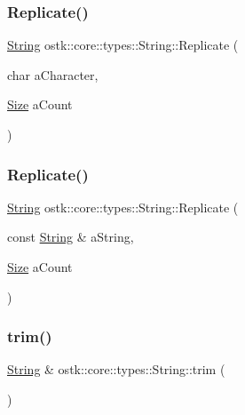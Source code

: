\subsubsection{\texorpdfstring{Replicate()}{Replicate()}\hspace{0.1cm}{\footnotesize\ttfamily [1/2]}}
{\footnotesize\ttfamily \hyperlink{classostk_1_1core_1_1types_1_1_string}{String} ostk\+::core\+::types\+::\+String\+::\+Replicate (\begin{DoxyParamCaption}\item[{char}]{a\+Character,  }\item[{\hyperlink{namespaceostk_1_1core_1_1types_acf68f214a245e35a7c1994c84dc56746}{Size}}]{a\+Count }\end{DoxyParamCaption})\hspace{0.3cm}{\ttfamily [static]}}

\mbox{\label{classostk_1_1core_1_1types_1_1_string_afb3e7dae9340e7494ec875b6f65312d2}} 
\subsubsection{\texorpdfstring{Replicate()}{Replicate()}\hspace{0.1cm}{\footnotesize\ttfamily [2/2]}}
{\footnotesize\ttfamily \hyperlink{classostk_1_1core_1_1types_1_1_string}{String} ostk\+::core\+::types\+::\+String\+::\+Replicate (\begin{DoxyParamCaption}\item[{const \hyperlink{classostk_1_1core_1_1types_1_1_string}{String} \&}]{a\+String,  }\item[{\hyperlink{namespaceostk_1_1core_1_1types_acf68f214a245e35a7c1994c84dc56746}{Size}}]{a\+Count }\end{DoxyParamCaption})\hspace{0.3cm}{\ttfamily [static]}}

\mbox{\label{classostk_1_1core_1_1types_1_1_string_a3fae6c7f00df2fb868949179fa20033e}} 
\subsubsection{\texorpdfstring{trim()}{trim()}}
{\footnotesize\ttfamily \hyperlink{classostk_1_1core_1_1types_1_1_string}{String} \& ostk\+::core\+::types\+::\+String\+::trim (\begin{DoxyParamCaption}{ }\end{DoxyParamCaption})}




